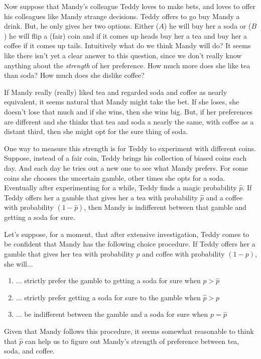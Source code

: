 Now suppose that Mandy's colleague Teddy loves to make bets, and loves to offer his colleagues like Mandy strange decisions.  Teddy offers to go buy Mandy a drink.  But, he only gives her two options.  Either ($A$) he will buy her a soda or ($B$) he will flip a (fair) coin and if it comes up heads buy her a tea and buy her a coffee if it comes up tails.  
Intuitively what do we think Mandy will do?  It seems like there isn't yet a clear answer to this question, since we don't really know anything about the {\it strength} of her preference.  How much more does she like tea than soda?  How much does she dislike coffee?  

If Mandy really (really) liked tea and regarded soda and coffee as nearly equivalent, it seems natural that Mandy might take the bet.  If she loses, she doesn't lose that much and if she wins, then she wins big.  But, if her preferences are different and she thinks that tea and soda a nearly the same, with coffee as a distant third, then she might opt for the sure thing of soda.

One way to measure this strength is for Teddy to experiment with different coins.  Suppose, instead of a fair coin, Teddy brings his collection of biased coins each day.  And each day he tries out a new one to see what Mandy prefers.  For some coins she chooses the uncertain gamble, other times she opts for a soda.  Eventually after experimenting for a while, Teddy finds a magic probability $\hat{p}$.  If Teddy offers her a gamble that gives her a tea with probability $\hat{p}$ and a coffee with probability $(1-\hat{p})$, then Mandy is indifferent between that gamble and getting a soda for sure.

Let's suppose, for a moment, that after extensive investigation, Teddy comes to be confident that Mandy has the following choice procedure.  If Teddy offers her a gamble that gives her tea with probability $p$ and coffee with probability $(1-p)$, she will...
\begin{enumerate}
\item ... strictly prefer the gamble to getting a soda for sure when $p > \hat{p}$
\item ... strictly prefer getting a soda for sure to the gamble when $\hat{p} > p$
\item ... be indifferent between the gamble and a soda for sure when $p = \hat{p}$
\end{enumerate}
Given that Mandy follows this procedure, it seems somewhat reasonable to think that $\hat{p}$ can help us to figure out Mandy's strength of preference between tea, soda, and coffee.  

